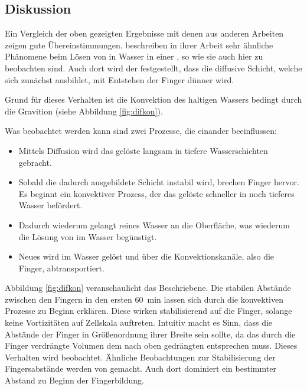 \subsection{Diskussion}
\label{res:cot:disk}

Ein Vergleich der oben gezeigten Ergebnisse mit denen aus anderen Arbeiten zeigen gute Übereinstimmungen.
\mbox{\citet{kneafsy}} beschreiben in ihrer Arbeit sehr ähnliche Phänomene beim Lösen von \COT in Wasser in einer \HSC, so wie sie auch hier zu beobachten sind. Auch dort wird der festgestellt, dass die diffusive Schicht, welche sich zunächst ausbildet, mit Entstehen der Finger dünner wird.

Grund für dieses Verhalten ist die Konvektion des \COTm haltigen Wassers bedingt durch die Gravition (siehe Abbildung \ref{fig:difkon}). 

Was beobachtet werden kann sind zwei Prozesse, die einander beeinflussen: 
\begin{itemize}
 \item Mittels Diffusion wird das gelöste \COT langsam in tiefere Wasserschichten gebracht.
 \item Sobald die dadurch ausgebildete Schicht instabil wird, brechen Finger hervor. Es beginnt ein konvektiver Prozess, der das gelöste \COT schneller in noch tieferes Wasser befördert.
 \item Dadurch wiederum gelangt reines Wasser an die Oberfläche, was wiederum die Lösung von \COT im Wasser begünstigt.
 \item Neues \COT wird im Wasser gelöst und über die Konvektionskanäle, also die Finger, abtransportiert.
\end{itemize}

Abbildung \ref{fig:difkon} veranschaulicht das Beschriebene.
Die stabilen Abstände zwischen den Fingern in den ersten \SI{60}{\minute} lassen sich durch die konvektiven Prozesse zu Beginn erklären. Diese wirken stabilisierend auf die Finger, solange keine Vortizitäten auf Zellskala auftreten.
Intuitiv macht es Sinn, dass die Abstände der Finger in Größenordnung ihrer Breite sein sollte, da das durch die Finger verdrängte Volumen dem nach oben gedrängten entsprechen muss. Dieses Verhalten wird beobachtet.
Ähnliche Beobachtungen zur Stabilisierung der Fingersabstände werden von \cite{fernandez} gemacht. Auch dort dominiert ein bestimmter Abstand zu Beginn der Fingerbildung. 

